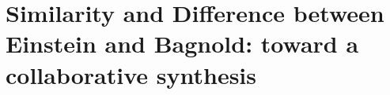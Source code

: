 \documentclass{article}
\begin{document}
































\section{Similarity and Difference between Einstein and Bagnold: toward a collaborative synthesis}
\end{document}

